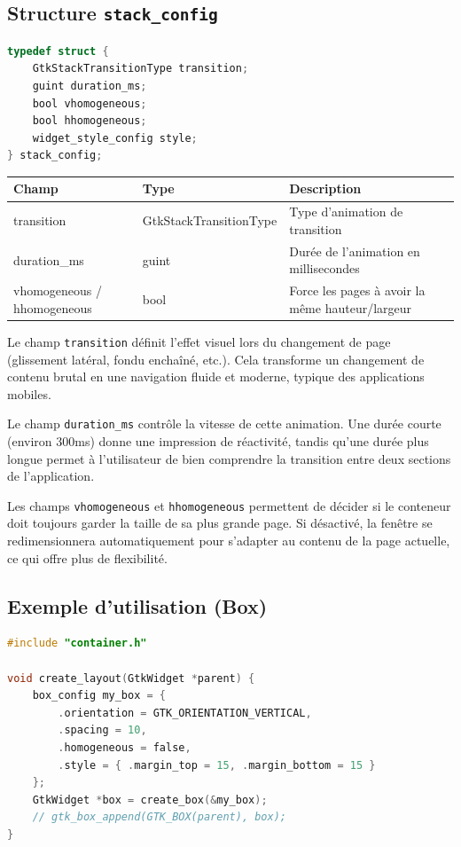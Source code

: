 \subsection{Structure \texttt{stack\_config}}
\begin{lstlisting}[language=C]
typedef struct {
    GtkStackTransitionType transition;
    guint duration_ms;
    bool vhomogeneous;
    bool hhomogeneous;
    widget_style_config style;
} stack_config;
\end{lstlisting}
\begin{center}
\begin{tabular}{|l|l|>{\raggedright\arraybackslash}p{6cm}|}
\hline
\textbf{Champ} & \textbf{Type} & \textbf{Description} \\
\hline
transition & GtkStackTransitionType & Type d'animation de transition \\
\hline
duration\_ms & guint & Durée de l'animation en millisecondes \\
\hline
vhomogeneous / hhomogeneous & bool & Force les pages à avoir la même hauteur/largeur \\
\hline
\end{tabular}
\end{center}

\bigskip

Le champ \texttt{transition} définit l'effet visuel lors du changement de page (glissement latéral, fondu enchaîné, etc.). Cela transforme un changement de contenu brutal en une navigation fluide et moderne, typique des applications mobiles.

Le champ \texttt{duration\_ms} contrôle la vitesse de cette animation. Une durée courte (environ 300ms) donne une impression de réactivité, tandis qu'une durée plus longue permet à l'utilisateur de bien comprendre la transition entre deux sections de l'application.

Les champs \texttt{vhomogeneous} et \texttt{hhomogeneous} permettent de décider si le conteneur doit toujours garder la taille de sa plus grande page. Si désactivé, la fenêtre se redimensionnera automatiquement pour s'adapter au contenu de la page actuelle, ce qui offre plus de flexibilité.


\subsection{Exemple d'utilisation (Box)}

\begin{lstlisting}[language=C]
#include "container.h"

void create_layout(GtkWidget *parent) {
    box_config my_box = {
        .orientation = GTK_ORIENTATION_VERTICAL,
        .spacing = 10,
        .homogeneous = false,
        .style = { .margin_top = 15, .margin_bottom = 15 }
    };
    GtkWidget *box = create_box(&my_box);
    // gtk_box_append(GTK_BOX(parent), box);
}
\end{lstlisting}